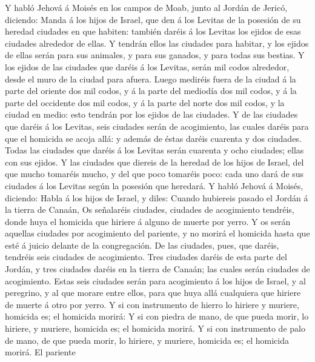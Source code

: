  Y habló Jehová á Moisés en los campos de Moab, junto al
Jordán de Jericó, diciendo:  Manda á los hijos de Israel,
que den á los Levitas de la posesión de su heredad ciudades en que
habiten: también daréis á los Levitas los ejidos de esas ciudades
alrededor de ellas.  Y tendrán ellos las ciudades para
habitar, y los ejidos de ellas serán para sus animales, y para sus
ganados, y para todas sus bestias.  Y los ejidos de las
ciudades que daréis á los Levitas, serán mil codos alrededor, desde el
muro de la ciudad para afuera.  Luego mediréis fuera de la
ciudad á la parte del oriente dos mil codos, y á la parte del mediodía
dos mil codos, y á la parte del occidente dos mil codos, y á la parte
del norte dos mil codos, y la ciudad en medio: esto tendrán por los
ejidos de las ciudades.  Y de las ciudades que daréis á
los Levitas, seis ciudades serán de acogimiento, las cuales daréis para
que el homicida se acoja allá: y además de éstas daréis cuarenta y dos
ciudades.  Todas las ciudades que daréis á los Levitas
serán cuarenta y ocho ciudades; ellas con sus ejidos.  Y
las ciudades que diereis de la heredad de los hijos de Israel, del que
mucho tomaréis mucho, y del que poco tomaréis poco: cada uno dará de sus
ciudades á los Levitas según la posesión que heredará.  Y
habló Jehová á Moisés, diciendo:  Habla á los hijos de
Israel, y diles: Cuando hubiereis pasado el Jordán á la tierra de
Canaán,  Os señalaréis ciudades, ciudades de acogimiento
tendréis, donde huya el homicida que hiriere á alguno de muerte por
yerro.  Y os serán aquellas ciudades por acogimiento del
pariente, y no morirá el homicida hasta que esté á juicio delante de la
congregación.  De las ciudades, pues, que daréis,
tendréis seis ciudades de acogimiento.  Tres ciudades
daréis de esta parte del Jordán, y tres ciudades daréis en la tierra de
Canaán; las cuales serán ciudades de acogimiento.  Estas
seis ciudades serán para acogimiento á los hijos de Israel, y al
peregrino, y al que morare entre ellos, para que huya allá cualquiera
que hiriere de muerte á otro por yerro.  Y si con
instrumento de hierro lo hiriere y muriere, homicida es; el homicida
morirá:  Y si con piedra de mano, de que pueda morir, lo
hiriere, y muriere, homicida es; el homicida morirá.  Y
si con instrumento de palo de mano, de que pueda morir, lo hiriere, y
muriere, homicida es; el homicida morirá.  El pariente
